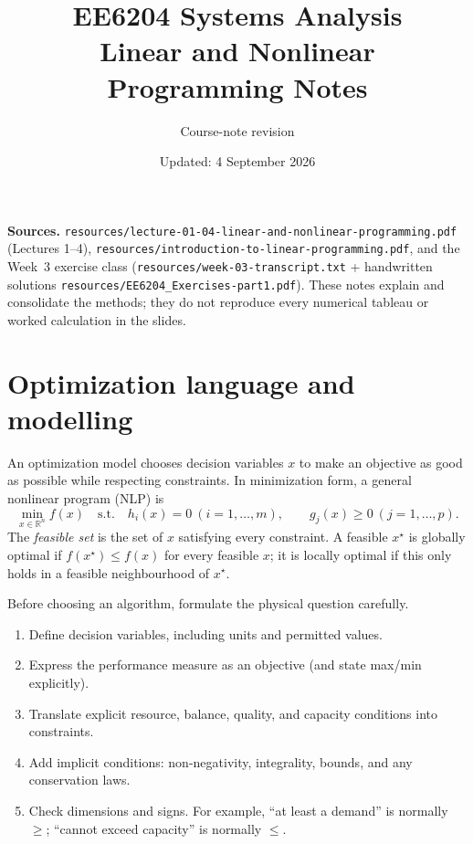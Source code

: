 \documentclass[11pt,a4paper]{article}
\title{EE6204 Systems Analysis\\\large Linear and Nonlinear Programming Notes}
\author{Course-note revision}
\date{Updated: 4 September 2026}
\renewcommand{\texttt}[1]{\nolinkurl{#1}}
\newcommand{\R}{\mathbb{R}}
\begin{document}
\maketitle

\noindent\textbf{Sources.} \texttt{resources/lecture-01-04-linear-and-nonlinear-programming.pdf} (Lectures 1--4),
\texttt{resources/introduction-to-linear-programming.pdf}, and the Week~3 exercise class (\texttt{resources/week-03-transcript.txt} + handwritten solutions \texttt{resources/EE6204\_Exercises-part1.pdf}). These notes explain and consolidate the methods; they do not reproduce every numerical tableau or worked calculation in the slides.

\tableofcontents
\newpage

\section{Optimization language and modelling}

An optimization model chooses decision variables $x$ to make an objective as good as possible while respecting constraints.  In minimization form, a general nonlinear program (NLP) is
\begin{equation}
 \min_{x\in\R^n} f(x)\quad\text{s.t.}\quad h_i(x)=0\ (i=1,\ldots,m),\qquad g_j(x)\geq 0\ (j=1,\ldots,p).
\end{equation}
The \emph{feasible set} is the set of $x$ satisfying every constraint. A feasible $x^\star$ is globally optimal if $f(x^\star)\leq f(x)$ for every feasible $x$; it is locally optimal if this only holds in a feasible neighbourhood of $x^\star$.

Before choosing an algorithm, formulate the physical question carefully.
\begin{enumerate}
 \item Define decision variables, including units and permitted values.
 \item Express the performance measure as an objective (and state max/min explicitly).
 \item Translate explicit resource, balance, quality, and capacity conditions into constraints.
 \item Add implicit conditions: non-negativity, integrality, bounds, and any conservation laws.
 \item Check dimensions and signs. For example, ``at least a demand'' is normally $\geq$; ``cannot exceed capacity'' is normally $\leq$.
\end{enumerate}
\end{document}
